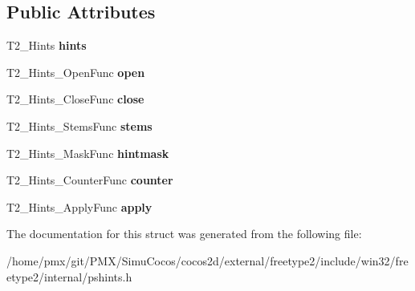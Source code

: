 \subsection*{Public Attributes}
\begin{DoxyCompactItemize}
\item 
\mbox{\label{structT2__Hints__FuncsRec___af8daab694889bede5a513fbae5f86e25}} 
T2\+\_\+\+Hints {\bfseries hints}
\item 
\mbox{\label{structT2__Hints__FuncsRec___a1a5e0b296ee2e2ae6711b3ee35e5fcd9}} 
T2\+\_\+\+Hints\+\_\+\+Open\+Func {\bfseries open}
\item 
\mbox{\label{structT2__Hints__FuncsRec___a7e50e26fd55254044bc9f2ba62574352}} 
T2\+\_\+\+Hints\+\_\+\+Close\+Func {\bfseries close}
\item 
\mbox{\label{structT2__Hints__FuncsRec___a12bfd8bae5d3df8f570fcdfb70c00139}} 
T2\+\_\+\+Hints\+\_\+\+Stems\+Func {\bfseries stems}
\item 
\mbox{\label{structT2__Hints__FuncsRec___af50d0cadda7033d7dbd27a199ccfcdd4}} 
T2\+\_\+\+Hints\+\_\+\+Mask\+Func {\bfseries hintmask}
\item 
\mbox{\label{structT2__Hints__FuncsRec___ad9d856a64b4a8556fc8d74bae1779e11}} 
T2\+\_\+\+Hints\+\_\+\+Counter\+Func {\bfseries counter}
\item 
\mbox{\label{structT2__Hints__FuncsRec___abaf12efb416bd79cf4ce72b13e6fc68f}} 
T2\+\_\+\+Hints\+\_\+\+Apply\+Func {\bfseries apply}
\end{DoxyCompactItemize}


The documentation for this struct was generated from the following file\+:\begin{DoxyCompactItemize}
\item 
/home/pmx/git/\+P\+M\+X/\+Simu\+Cocos/cocos2d/external/freetype2/include/win32/freetype2/internal/pshints.\+h\end{DoxyCompactItemize}
